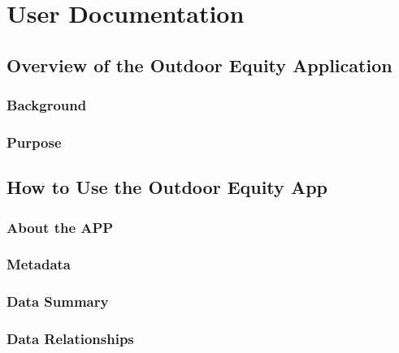 \documentclass[
]{book}
\begin{document}
\hypertarget{user-documentation}{%
\chapter{User Documentation}\label{user-documentation}}

\hypertarget{overview-of-the-outdoor-equity-application}{%
\section{Overview of the Outdoor Equity Application}\label{overview-of-the-outdoor-equity-application}}

\hypertarget{background-1}{%
\subsection{Background}\label{background-1}}

\hypertarget{purpose}{%
\subsection{Purpose}\label{purpose}}

\hypertarget{how-to-use-the-outdoor-equity-app}{%
\section{How to Use the Outdoor Equity App}\label{how-to-use-the-outdoor-equity-app}}

\hypertarget{about-the-app}{%
\subsection{About the APP}\label{about-the-app}}

\hypertarget{metadata-1}{%
\subsection{Metadata}\label{metadata-1}}

\hypertarget{data-summary}{%
\subsection{Data Summary}\label{data-summary}}

\hypertarget{data-relationships}{%
\subsection{Data Relationships}\label{data-relationships}}
\end{document}
